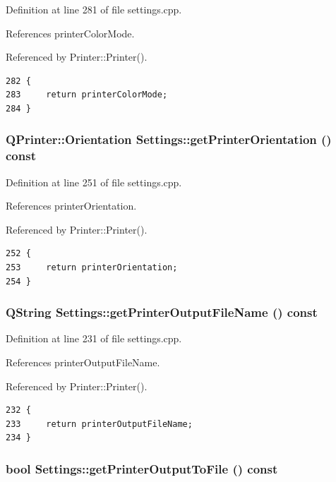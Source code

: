 Definition at line 281 of file settings.cpp.

References printer\-Color\-Mode.

Referenced by Printer::Printer().

\footnotesize\begin{verbatim}282 {
283     return printerColorMode;
284 }
\end{verbatim}\normalsize 


\hypertarget{classSettings_a27}{
\subsubsection[getPrinterOrientation]{\setlength{\rightskip}{0pt plus 5cm}QPrinter::Orientation Settings::get\-Printer\-Orientation () const}}
\label{classSettings_a27}


Definition at line 251 of file settings.cpp.

References printer\-Orientation.

Referenced by Printer::Printer().

\footnotesize\begin{verbatim}252 {
253     return printerOrientation;
254 }
\end{verbatim}\normalsize 


\hypertarget{classSettings_a23}{
\subsubsection[getPrinterOutputFileName]{\setlength{\rightskip}{0pt plus 5cm}QString Settings::get\-Printer\-Output\-File\-Name () const}}
\label{classSettings_a23}


Definition at line 231 of file settings.cpp.

References printer\-Output\-File\-Name.

Referenced by Printer::Printer().

\footnotesize\begin{verbatim}232 {
233     return printerOutputFileName;
234 }
\end{verbatim}\normalsize 


\hypertarget{classSettings_a21}{
\subsubsection[getPrinterOutputToFile]{\setlength{\rightskip}{0pt plus 5cm}bool Settings::get\-Printer\-Output\-To\-File () const}}
\label{classSettings_a21}


